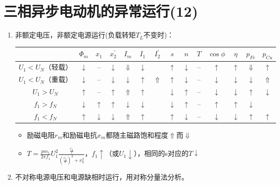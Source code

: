 \documentclass[blue]{elegantnote}
\begin{document}
\chapter{三相异步电动机的异常运行(12)}
\begin{enumerate}
	\item 非额定电压，非额定电源运行(负载转矩$T_L$不变时)：
	\begin{table}[htb]
		\centering
		
		\begin{tabular}{|c|c|c|c|c|c|c|c|c|c|c|c|c|c|}
			\hline 
			& $\Phi_m$ & $x_1$ & $x_2^{'}$ & $I_m$ & $I_1$ & $I_2^{'}$ & $s$ & $n$ & $T$ & $\cos\phi$ & $\eta$ & $p_{Fe}$  & $p_{Cu}$ \\ \hline
			$U_{1}<U_{N}$（轻载） & $\downarrow$ & -- & $\downarrow$ & $\Downarrow$ & $\downarrow$ &  & $\uparrow$ & $\downarrow$ & -- & $\uparrow$ &  $\uparrow$ & $\Downarrow$ & $\uparrow$ \\ \hline
			
			$U_{1}<U_{N}$（重载） & $\downarrow$ & -- & $\downarrow$  & $\downarrow$ & $\uparrow$ & $\Uparrow$  & $\uparrow$ & $\downarrow$ & -- &  $\downarrow$ & $\downarrow$ & $\downarrow$ & $\Uparrow$ \\ \hline
			
			$U_{1}>U_{N}$ & $\uparrow$ & -- & $\uparrow$ & $\Uparrow$  & $\uparrow$ &  & $\downarrow$ & $\uparrow$ & -- & $\downarrow$ & $\downarrow$ & $\uparrow$ &$\downarrow$ \\ \hline
			
			\hline\hline
			
			$f_{1}>f_{N}$ & $\downarrow$ & $\uparrow$ & $\uparrow$ & $\downarrow$ & $\downarrow$ & & $\downarrow$&$\uparrow$   &-- & $\uparrow$  & $\uparrow$ & $\downarrow$ &  \\ \hline
			
			$f_{1}<f_{N}$ & $\uparrow$ & $\downarrow$ & $\downarrow$& $\Uparrow$ & $\uparrow$ & & $\uparrow$ & $\downarrow$ & -- & $\downarrow$ &  $\downarrow$ & $\uparrow$ & $\uparrow$ \\ \hline
			
		\end{tabular}
	\end{table}
	
	\begin{note}
		\begin{itemize}
			\item 励磁电阻$r_m$和励磁电抗$x_m$都随主磁路饱和程度$\Uparrow$而$\Downarrow$
			\item $T=\frac{pm_1}{2\pi f_1}U_1^{2}\frac{\frac{r_2^{'}}{s}}{(\frac{r_2^{'}}{s})^{2}+x_k^{2}}$，$f_1\uparrow$（或$U_1\downarrow$），相同的s对应的$T\downarrow$
		\end{itemize}
	\end{note}
	\item 不对称电源电压和电源缺相时运行，用{\color{thid}对称分量法}分析。
\end{enumerate}
\end{document}
